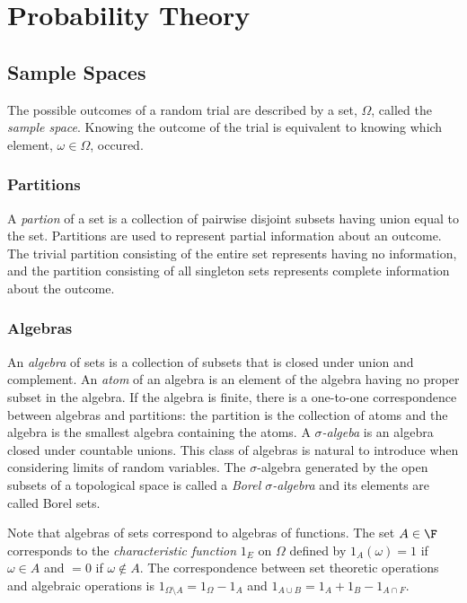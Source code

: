 \chapter{Probability Theory}

\section{Sample Spaces}
\label{pt-ss}
The possible outcomes of a random trial are described by a set, $\Omega$, called the
{\em sample space}. Knowing the outcome of the trial is equivalent to knowing
which element, $\omega\in\Omega$, occured.

\subsection{Partitions}
A {\em partion} of a set is a collection of pairwise disjoint
subsets having union equal to the set. Partitions are used to
represent partial information about an outcome.
The trivial partition consisting of the entire set represents
having no information, and the partition consisting of all
singleton sets represents complete information about the outcome.

\subsection{Algebras}
An {\em algebra} of sets is a collection of subsets
that is closed under union and complement. 
An {\em atom} of an algebra is an element of the algebra having no
proper subset in the algebra.
If the algebra is finite, there is a one-to-one correspondence between algebras and partitions:
the partition is the collection of atoms and
the algebra is the smallest algebra containing the atoms.
A {\em $\sigma$-algeba} is an algebra closed under countable unions. This class of
algebras is natural to introduce when considering
limits of random variables. The $\sigma$-algebra
generated by the open subsets of a topological space is called a {\em Borel  $\sigma$-algebra}
and its elements are called Borel sets.

Note that algebras of sets correspond to algebras of functions. The set $A\in\F$
corresponds to the {\em characteristic function} $1_E$ on $\Omega$ defined by
$1_A(\omega) = 1$ if $\omega\in A$ and $= 0$ if $\omega\not\in A$. The correspondence between
set theoretic operations and algebraic operations is $1_{\Omega\setminus A} = 1_\Omega - 1_A$ and
$1_{A\cup B} = 1_A + 1_B - 1_{A\cap F}$.

